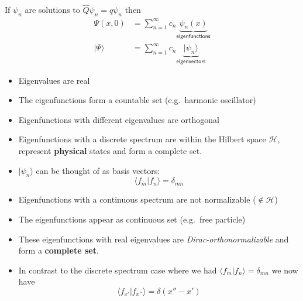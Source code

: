 \newpar{}

If $\psi_n$ are solutions to $\hat{Q}\psi_n=q\psi_n$ then
\noindent\begin{align*}
    \Psi(x,0)    & = \sum_{n=1}^{\infty} c_n \underbrace{\psi_n(x)}_{\textsf{eigenfunctions}}    \\
    |\Psi\rangle & = \sum_{n=1}^{\infty} c_n \underbrace{|\psi_n\rangle}_{\textsf{eigenvectors}}
\end{align*}

\begin{itemize}
    \item Eigenvalues are real
    \item The eigenfunctions form a countable set (e.g.\ harmonic oscillator)
    \item Eigenfunctions with different eigenvalues are orthogonal
    \item Eigenfunctions with a discrete spectrum are within the Hilbert space $\mathcal{H}$, represent \textbf{physical} states and form a complete set.
    \item $|\psi_n\rangle$ can be thought of as basis vectors:
        \noindent\begin{equation*}
            \langle f_m|f_n\rangle=\delta_{mn}
        \end{equation*}
\end{itemize}


\begin{itemize}
    \item Eigenfunctions with a continuous spectrum are not normalizable ($\notin \mathcal{H}$)
    \item The eigenfunctions appear as continuous set (e.g.\ free particle)
    \item These eigenfunctions with real eigenvalues are \textit{Dirac-orthonormalizable} and form a \textbf{complete set}.
    \item In contrast to the discrete spectrum case where we had $\langle f_m|f_n\rangle=\delta_{mn}$ we now have
          \noindent\begin{equation*}
              \langle f_{x'}|f_{x''}\rangle=\delta(x''-x')
          \end{equation*}
\end{itemize}

